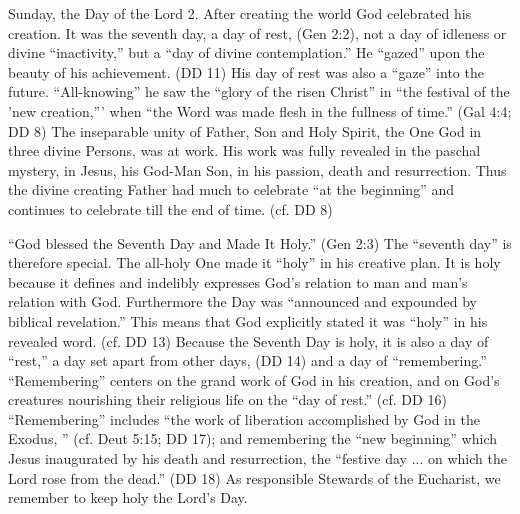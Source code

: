 \documentclass[oneside]{book}
\begin{document}
Sunday, the Day of the Lord
2. After creating the world God celebrated his creation. It was the seventh day,
a day of rest, (Gen 2:2), not a day of idleness or divine ``inactivity,'' but a
``day of divine contemplation.'' He ``gazed'' upon the beauty of his
achievement. (DD 11) His day of rest was also a ``gaze'' into the
future. ``All-knowing'' he saw the ``glory of the risen Christ'' in ``the
festival of the 'new creation,''' when ``the Word was made flesh in the fullness
of time.'' (Gal 4:4; DD 8) The inseparable unity of Father, Son and Holy Spirit,
the One God in three divine Persons, was at work. His work was fully revealed in
the paschal mystery, in Jesus, his God-Man Son, in his passion, death and
resurrection. Thus the divine creating Father had much to celebrate ``at the
beginning'' and continues to celebrate till the end of time. (cf. DD 8)

``God blessed the Seventh Day and Made It Holy.'' (Gen 2:3) The ``seventh day''
is therefore special. The all-holy One made it ``holy'' in his creative plan. It
is holy because it defines and indelibly expresses God's relation to man and
man's relation with God. Furthermore the Day was ``announced and expounded by
biblical revelation.'' This means that God explicitly stated it was ``holy'' in
his revealed word. (cf. DD 13) Because the Seventh Day is holy, it is also a day
of ``rest,'' a day set apart from other days, (DD 14) and a day of
``remembering.'' ``Remembering'' centers on the grand work of God in his
creation, and on God's creatures nourishing their religious life on the ``day of
rest.'' (cf. DD 16) ``Remembering'' includes ``the work of liberation
accomplished by God in the Exodus, '' (cf. Deut 5:15; DD 17); and remembering
the ``new beginning'' which Jesus inaugurated by his death and resurrection, the
``festive day ... on which the Lord rose from the dead.'' (DD 18) As responsible
Stewards of the Eucharist, we remember to keep holy the Lord's Day.
\end{document}
